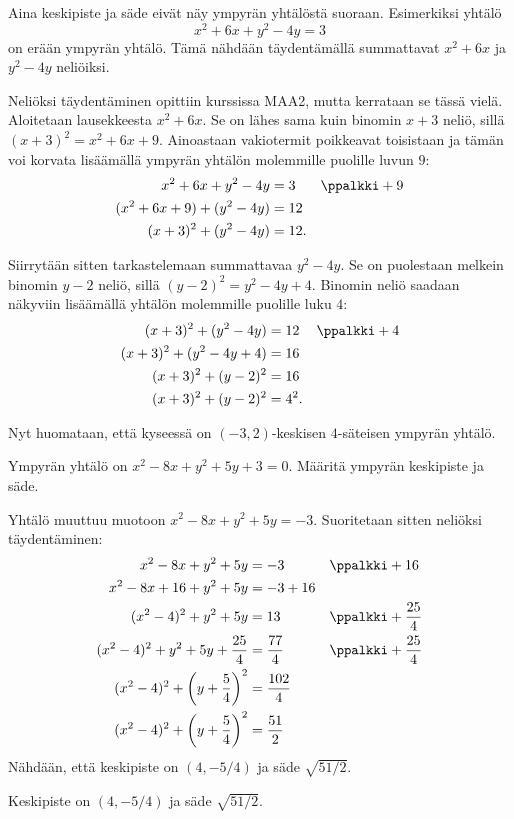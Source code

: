 Aina keskipiste ja säde eivät näy ympyrän yhtälöstä suoraan.
Esimerkiksi yhtälö
\[
x^2+6x+y^2-4y=3
\]
on erään ympyrän yhtälö.
Tämä nähdään täydentämällä summattavat $x^2+6x$ ja $y^2-4y$ neliöiksi.

Neliöksi täydentäminen opittiin kurssissa MAA2, mutta kerrataan se tässä vielä.
Aloitetaan lausekkeesta $x^2+6x$. Se on lähes sama kuin binomin $x+3$ neliö, sillä $(x+3)^2=x^2+6x+9$. Ainoastaan vakiotermit poikkeavat toisistaan ja tämän voi korvata lisäämällä ympyrän yhtälön molemmille puolille luvun $9$: 
\begin{align*}
x^2+6x+y^2-4y &= 3 && \ppalkki +9 \\
(x^2+6x+9)+(y^2-4y) &= 12 && \\
(x+3)^2+(y^2-4y) &= 12.&& 
\end{align*}

Siirrytään sitten tarkastelemaan summattavaa $y^2-4y$. Se on puolestaan melkein binomin $y-2$ neliö, sillä $(y-2)^2=y^2-4y+4$. Binomin neliö saadaan näkyviin lisäämällä yhtälön molemmille puolille luku $4$:
\begin{align*}
(x+3)^2+(y^2-4y) &= 12 && \ppalkki +4\\
(x+3)^2+(y^2-4y+4) &= 16 && \\
(x+3)^2+(y-2)^2 &= 16 && \\
(x+3)^2+(y-2)^2 &= 4^2.&& 
\end{align*}

Nyt huomataan, että kyseessä on $(-3, 2)$-keskisen $4$-säteisen ympyrän yhtälö.

\begin{esimerkki}
Ympyrän yhtälö on $x^2-8x+y^2+5y+3=0$. Määritä ympyrän keskipiste ja säde.
\begin{esimratk}
Yhtälö muuttuu muotoon $x^2-8x+y^2+5y=-3$. Suoritetaan sitten neliöksi täydentäminen:
\begin{align*}
x^2-8x+y^2+5y&=-3 && \ppalkki +16\\
x^2-8x+16+y^2+5y&=-3+16 && \\
(x^2-4)^2+y^2+5y&=13 && \ppalkki +\frac{25}{4}\\
(x^2-4)^2+y^2+5y+\frac{25}{4}&=\frac{77}{4} && \ppalkki +\frac{25}{4}\\
(x^2-4)^2+\left(y+\frac{5}{4}\right)^2&=\frac{102}{4} && \\
(x^2-4)^2+\left(y+\frac{5}{4}\right)^2&=\frac{51}{2} && 
\end{align*}
Nähdään, että keskipiste on $(4, -5/4)$ ja säde $\sqrt{51/2}$.
\end{esimratk}
\begin{esimvast}
Keskipiste on $(4, -5/4)$ ja säde $\sqrt{51/2}$.
\end{esimvast}
\end{esimerkki}

